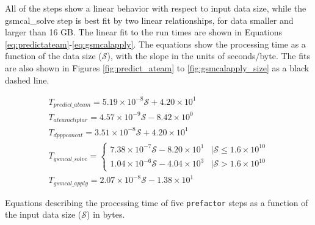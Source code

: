 \documentclass[preprint,5p]{elsarticle}
\begin{document}
All of the steps show a linear behavior with respect to input data size, while the {\selectfont gsmcal\_solve step} is best fit by two linear relationships, for data smaller and larger than 16 GB. The linear fit to the run times are shown in Equations \ref{eq:predictateam}-\ref{eq:gsmcalapply}. The equations show the processing time as a function of the data size ($\mathcal{S}$), with the slope in the units of seconds/byte. The fits are also shown in Figures \ref{fig:predict_ateam} to \ref{fig:gsmcalapply_size} as a black dashed line.

\begin{equ*}
\begin{subequations}
\begin{align}
        T_{predict\_ateam}=5.19\times10^{-8}\mathcal{S}+4.20\times10^1 \label{eq:predictateam} \\
        T_{ateamcliptar}=4.57\times10^{-9}\mathcal{S}-8.42\times10^0 \label{eq:ateamcliptar} \\
        T_{dpppconcat}=3.51\times10^{-8}\mathcal{S}+4.20\times10^1 \label{eq:dpppconcat} \\
        T_{gsmcal\_solve}=\begin{cases}
                          7.38\times10^{-7}\mathcal{S}-8.20\times10^1 &|\mathcal{S}\leq1.6\times10^{10}\\
                          1.04\times10^{-6}\mathcal{S}-4.04\times10^3 & |\mathcal{S}>1.6\times10^{10}
    \end{cases} \label{eq:gsmcalsolve} \\
        T_{gsmcal\_apply}=2.07\times10^{-8}\mathcal{S}-1.38\times10^1 \label{eq:gsmcalapply}    
\end{align}
\label{eq:runtime_size_models}
\end{subequations}
\caption{Equations describing the processing time of five \texttt{prefactor} steps as a function of the input data size ($\mathcal{S}$) in bytes.}
\end{equ*}
\end{document}
